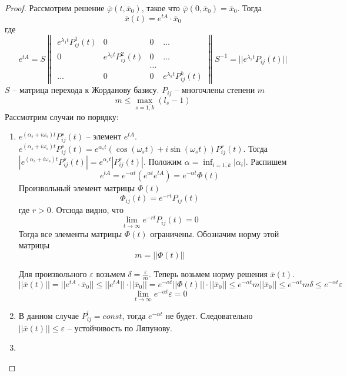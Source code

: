 \documentclass[a4paper, 12pt]{article}
\begin{document}
	\begin{proof}
		Рассмотрим решение $\bar{\varphi}(t, \bar{x}_0)$, такое что $\bar{\varphi}(0, \bar{x}_0)=\bar{x}_0$. Тогда
		\[
			\bar{x}(t) = e^{tA}\cdot \bar{x}_0
		\]
		где 
		\[
			e^{tA} = S\begin{Vmatrix}
			e^{\lambda_1t}P_{ij}^1(t) &0&0&\dots\\
			0&e^{\lambda_2t}P_{ij}^2(t)&0&\dots\\
			&&\dots\\
			\dots&0&0& e^{\lambda_kt}P_{ij}^k(t)
			\end{Vmatrix}S^{-1} = ||e^{\lambda_st}P_{ij}(t)||
		\]
		$S$ -- матрица перехода к Жорданову базису. $P_{ij}$ -- многочлены степени $m$ $$m \leq \max_{s=\overline{1,k}}(l_s-1)$$
		Рассмотрим случаи по порядку:
		\begin{enumerate}
			\item $e^{(\alpha_s+i\omega_s)t}P_{ij}^s(t)$ -- элемент $e^{tA}$. $e^{(\alpha_s+i\omega_s)t}P_{ij}^s(t) = e^{\alpha_st}(\cos{(\omega_s t)}+i\sin{(\omega_s t)})P_{ij}^s(t)$. Тогда $|e^{(\alpha_s+i\omega_s)t}P_{ij}^s(t)| = e^{\alpha_st}|P_{ij}^s(t)|$. Положим $\alpha = \inf_{i=\overline{1,k}}|\alpha_i|$. Распишем
			\[
				e^{tA} = e^{-\alpha t}(e^{\alpha t}e^{tA}) = e^{-\alpha t}\Phi(t)
			\]
			Произвольный элемент матрицы $\Phi(t)$
			\[
				\Phi_{ij}(t) = e^{-rt}P_{ij}(t)
			\]
			где $r>0$. Отсюда видно, что 
			\[
				\lim_{t\to\infty}e^{-rt}P_{ij}(t) = 0
			\]
			Тогда все элементы матрицы $\Phi(t)$ ограничены. Обозначим норму этой матрицы
			\[
				m = ||\Phi(t)||
			\]
			
			Для произвольного $\varepsilon$ возьмем $\delta = \frac{\varepsilon}{m}$. Теперь возьмем норму решения $\bar{x}(t)$.
			\[
				||\bar{x}(t)|| = ||e^{tA}\cdot \bar{x}_0|| \leq ||e^{tA}||\cdot|| \bar{x}_0|| = e^{-\alpha t}||\Phi(t)||\cdot|| \bar{x}_0||\leq e^{-\alpha t}m|| \bar{x}_0||\leq e^{-\alpha t}m\delta\leq e^{-\alpha t}\varepsilon
			\]
			\[
				\lim_{t\to\infty}e^{-\alpha t}\varepsilon = 0
			\]
			
			\item В данном случае $P_{ij}^l = const$, тогда $e^{-\alpha t}$ не будет. Следовательно $||\bar{x}(t)||\leq \varepsilon$ -- устойчивость по Ляпунову.
			\item 
		\end{enumerate}
		
	\end{proof}
	
	
\end{document}
